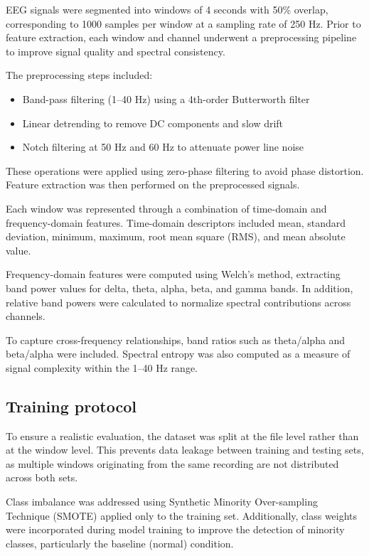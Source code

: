 \documentclass[10pt]{iopart}
\begin{document}
EEG signals were segmented into windows of 4 seconds with 50\% overlap, corresponding to 1000 samples per window at a sampling rate of 250 Hz. Prior to feature extraction, each window and channel underwent a preprocessing pipeline to improve signal quality and spectral consistency.

The preprocessing steps included:

\begin{itemize}
\item Band-pass filtering (1--40 Hz) using a 4th-order Butterworth filter
\item Linear detrending to remove DC components and slow drift
\item Notch filtering at 50 Hz and 60 Hz to attenuate power line noise
\end{itemize}

These operations were applied using zero-phase filtering to avoid phase distortion. Feature extraction was then performed on the preprocessed signals.

Each window was represented through a combination of time-domain and frequency-domain features. Time-domain descriptors included mean, standard deviation, minimum, maximum, root mean square (RMS), and mean absolute value.

Frequency-domain features were computed using Welch's method, extracting band power values for delta, theta, alpha, beta, and gamma bands. In addition, relative band powers were calculated to normalize spectral contributions across channels.

To capture cross-frequency relationships, band ratios such as theta/alpha and beta/alpha were included. Spectral entropy was also computed as a measure of signal complexity within the 1--40 Hz range.

\subsection{Training protocol}

To ensure a realistic evaluation, the dataset was split at the file level rather than at the window level. This prevents data leakage between training and testing sets, as multiple windows originating from the same recording are not distributed across both sets.

Class imbalance was addressed using Synthetic Minority Over-sampling Technique (SMOTE) applied only to the training set. Additionally, class weights were incorporated during model training to improve the detection of minority classes, particularly the baseline (normal) condition.
\end{document}
